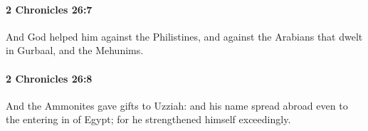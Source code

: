 		\paragraph{2 Chronicles 26:7} %
			\label{2CHRONICLES-26-7}

			And God helped him against the Philistines, and against the Arabians that dwelt in Gurbaal, and the Mehunims.


		\paragraph{2 Chronicles 26:8} %
			\label{2CHRONICLES-26-8}

			And the Ammonites gave gifts to Uzziah: and his name spread abroad even to the entering in of Egypt; for he strengthened himself exceedingly.



